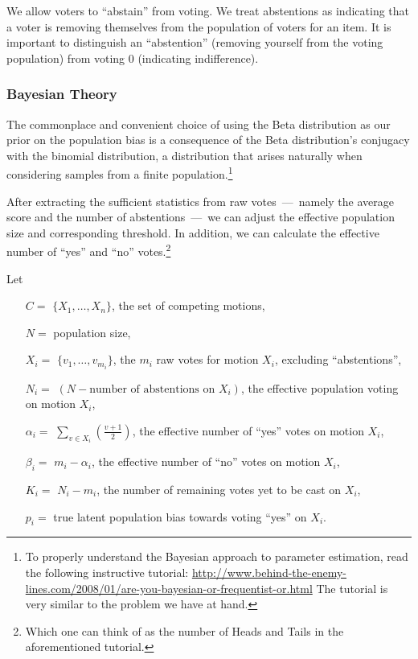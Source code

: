 \documentclass{sigchi}
\begin{document}
We allow voters to ``abstain'' from voting.
We treat abstentions as indicating that a voter is removing themselves from the population of voters for an item.
It is important to distinguish an ``abstention'' (removing yourself from the voting population) from voting $0$
(indicating indifference).

\subsubsection{Bayesian Theory}

The commonplace and convenient choice of using the Beta distribution as our prior on the population bias is a
consequence of the Beta distribution's conjugacy with the binomial distribution, a distribution that arises
naturally when considering samples from a finite population.\footnote{To
properly understand the Bayesian approach to parameter estimation, read the following instructive tutorial:
\url{http://www.behind-the-enemy-lines.com/2008/01/are-you-bayesian-or-frequentist-or.html}
The tutorial is very similar to the problem we have at hand.}

After extracting the sufficient statistics from raw votes~---~namely the average score and the number of
abstentions~---~we can adjust the effective population size and corresponding threshold.
In addition, we can calculate the effective number of ``yes'' and ``no'' votes.\footnote{Which one can think
of as the number of Heads and Tails in the aforementioned tutorial.}

Let
\begin{description}
\begin{itemize}
\item[$C = $] $\{X_1,\ldots, X_n\}$, the set of competing motions,
\item[$N = $] population size,
\item[$X_i = $] $\{v_1, \ldots, v_{m_i}\}$, the $m_i$ raw votes for motion $X_i$, excluding ``abstentions'',
\item[$N_i = $] $(N - \textrm{number of abstentions on } X_i)$, the effective population voting on motion $X_i$,
\item[$\alpha_i = $] $\sum\limits_{v \in X_i} \left(\frac{v+1}{2}\right)$, the effective number of ``yes'' votes on motion $X_i$,
\item[$\beta_i = $] $m_i - \alpha_i$, the effective number of ``no'' votes on motion $X_i$,
\item[$K_i = $] $N_i - m_i$, the number of remaining votes yet to be cast on $X_i$,
\item[$p_i = $] true latent population bias towards voting ``yes'' on $X_i$.
\end{itemize}
\end{description}
\end{document}
